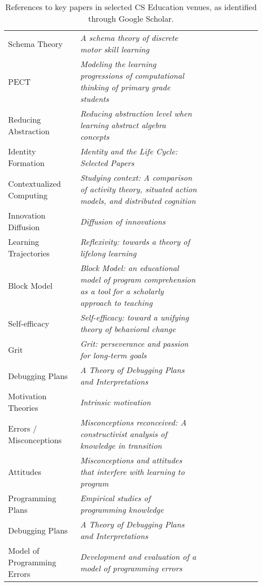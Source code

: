 \begin{table*}[t]
\begin{tabular}{p{3cm}p{7cm}lllllll}
Schema Theory & \textit{A schema theory of discrete motor skill learning} &  &  &  &  &  &  & \\
PECT & \textit{Modeling the learning progressions of computational thinking of primary grade students} &  &  &  &  &  &  & \\
Reducing Abstraction & \textit{Reducing abstraction level when learning abstract algebra concepts} &  &  &  &  &  &  & \\
Identity Formation & \textit{Identity and the Life Cycle: Selected Papers} &  &  &  &  &  &  & \\
Contextualized Computing & \textit{Studying context: A comparison of activity theory, situated action models, and distributed cognition} &  &  &  &  &  &  & \\
Innovation Diffusion & \textit{Diffusion of innovations} &  &  &  &  &  &  & \\
Learning Trajectories & \textit{Reflexivity: towards a theory of lifelong learning} &  &  &  &  &  &  & \\

Block Model & \textit{Block Model: an educational model of program comprehension as a tool for a scholarly approach to teaching} &  &  &  &  &  &  & \\
Self-efficacy & \textit{Self-efficacy: toward a unifying theory of behavioral change} &  &  &  &  &  &  & \\
Grit & \textit{Grit: perseverance and passion for long-term goals} &  &  &  &  &  &  & \\
Debugging Plans & \textit{A Theory of Debugging Plans and Interpretations} &  &  &  &  &  &  & \\
Motivation Theories & \textit{Intrinsic motivation} &  &  &  &  &  &  & \\
Errors / Misconceptions & \textit{Misconceptions reconceived: A constructivist analysis of knowledge in transition} &  &  &  &  &  &  & \\
Attitudes & \textit{Misconceptions and attitudes that interfere with learning to program} &  &  &  &  &  &  & \\
Programming Plans & \textit{Empirical studies of programming knowledge} &  &  &  &  &  &  & \\
Debugging Plans & \textit{A Theory of Debugging Plans and Interpretations} &  &  &  &  &  &  & \\
Model of Programming Errors & \textit{Development and evaluation of a model of programming errors} &  &  &  &  &  &  & \\
\end{tabular}
\caption{References to key papers in selected CS Education venues, as identified through Google Scholar.}
\end{table*}